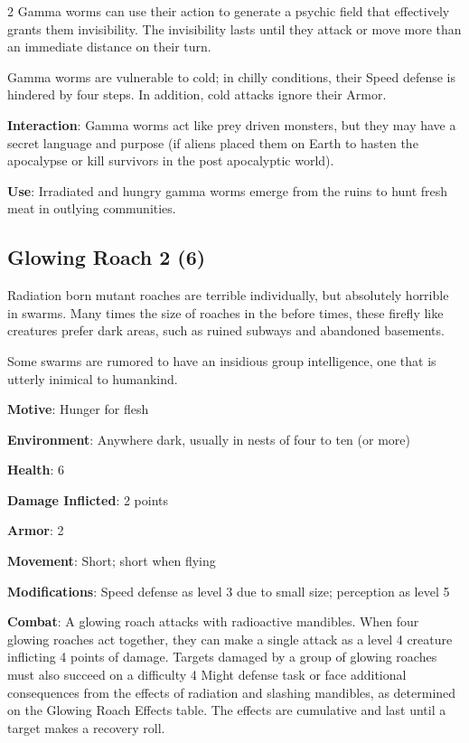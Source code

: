 \begin{multicols}{2}
Gamma worms can use their action to generate a psychic field that effectively grants them invisibility. The invisibility lasts until they attack or move more than an immediate distance on their turn. 

Gamma worms are vulnerable to cold; in chilly conditions, their Speed defense is hindered by four steps. In addition, cold attacks ignore their Armor. 

\textbf{Interaction}: Gamma worms act like prey driven monsters, but they may have a secret language and purpose (if aliens placed them on Earth to hasten the apocalypse or kill survivors in the post apocalyptic world). 

\textbf{Use}: Irradiated and hungry gamma worms emerge from the ruins to hunt fresh meat in outlying communities.

\subsection{Glowing Roach 2 (6)}

Radiation born mutant roaches are terrible individually, but absolutely horrible in swarms. Many times the size of roaches in the before times, these firefly like creatures prefer dark areas, such as ruined subways and abandoned basements. 

Some swarms are rumored to have an insidious group intelligence, one that is utterly inimical to humankind.

\textbf{Motive}: Hunger for flesh 

\textbf{Environment}: Anywhere dark, usually in nests of four to ten (or more) 

\textbf{Health}: 6 

\textbf{Damage Inflicted}: 2 points 

\textbf{Armor}: 2 

\textbf{Movement}: Short; short when flying 

\textbf{Modifications}: Speed defense as level 3 due to small size; perception as level 5 

\textbf{Combat}: A glowing roach attacks with radioactive mandibles. When four glowing roaches act together, they can make a single attack as a level 4 creature inflicting 4 points of damage. Targets damaged by a group of glowing roaches must also succeed on a difficulty 4 Might defense task or face additional consequences from the effects of radiation and slashing mandibles, as determined on the Glowing Roach Effects table. The effects are cumulative and last until a target makes a recovery roll. 


\end{multicols}
